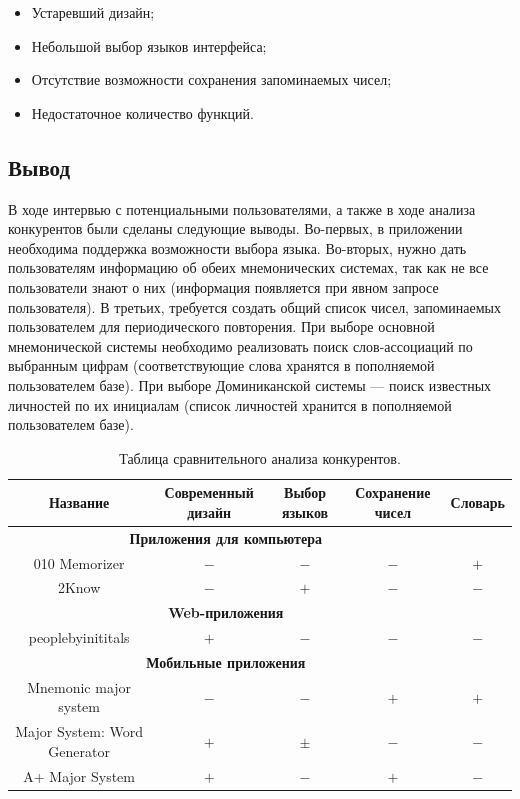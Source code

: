 \documentclass[draft]{article}
\begin{document}
\begin{itemize}
\item Устаревший дизайн;
\item Небольшой выбор языков интерфейса;
\item Отсутствие возможности сохранения запоминаемых чисел;
\item Недостаточное количество функций.
\end{itemize}
\begin{center}
\subsection{Вывод}
\end{center}
В ходе интервью с потенциальными пользователями, а также в ходе анализа конкурентов были сделаны следующие выводы. Во-первых, в приложении необходима поддержка возможности выбора языка. Во-вторых, нужно дать пользователям информацию об обеих мнемонических системах, так как не все пользователи знают о них (информация появляется при явном запросе пользователя). В третьих, требуется создать общий список чисел, запоминаемых пользователем для периодического повторения. При выборе основной мнемонической системы необходимо реализовать поиск слов-ассоциаций по выбранным цифрам (соответствующие слова хранятся в пополняемой пользователем базе). При выборе Доминиканской системы — поиск известных личностей по их инициалам (список личностей хранится в пополняемой пользователем базе).\\
\begin{table}[H]
\caption{\label{tab:canonsummary}Таблица сравнительного анализа конкурентов.}
\begin{center}
\begin{tabular}{|c|c|c|c|c|}
\hline
\textbf{Название} & \textbf{Современный дизайн} & \textbf{Выбор языков} & \textbf{Сохранение чисел} & \textbf{Словарь}\\
\hline
\multicolumn{4}{|c|}{\textbf{Приложения для компьютера}} \\
\hline
010 Memorizer
& $-$
& $-$
& $-$
& $+$ \\
\hline
2Know
& $-$
& $+$
& $-$
& $-$ \\
\hline
\multicolumn{4}{|c|}{\textbf{Web-приложения}} \\
\hline
peoplebyinititals
& $+$
& $-$
& $-$
& $-$ \\
\hline
\multicolumn{4}{|c|}{\textbf{Мобильные приложения}} \\
\hline
Mnemonic major system
& $-$
& $-$
& $+$
& $+$ \\
\hline
Major System: Word Generator
& $+$
& $\pm$
& $-$
& $-$ \\
\hline
A+ Major System
& $+$
& $-$
& $+$
& $-$ \\
\hline
\end{tabular}
\end{center}
\end{table} 
\newpage
\end{document}

